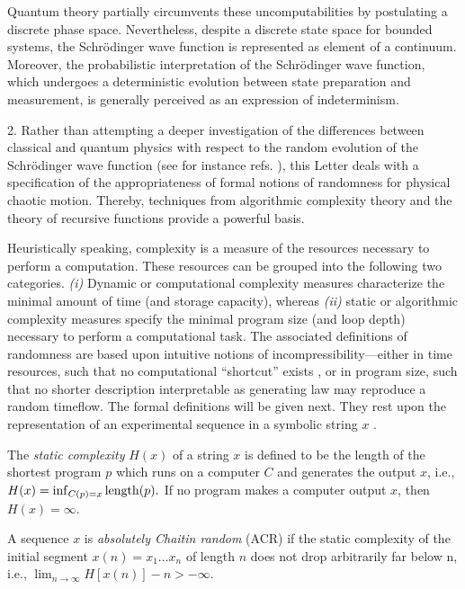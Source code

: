 Quantum theory partially circumvents these uncomputabilities
by postulating a discrete phase space. Nevertheless, despite a discrete
state space for bounded systems, the Schr\"odinger wave function is
represented as element of a continuum.
Moreover, the probabilistic interpretation of the Schr\"odinger wave
function, which undergoes a deterministic evolution between state
preparation and measurement, is generally perceived as
an expression of indeterminism.

2.
Rather than attempting a deeper investigation of the differences between
classical and quantum physics with respect to the random evolution
of the Schr\"odinger wave function (see
for instance refs.
\cite{krylov1,chirikov3,casati1,casati2,casati3,svozil1}),
this Letter deals with a specification of the appropriateness of formal
notions of randomness for physical chaotic motion.
Thereby, techniques from algorithmic complexity theory and the theory of
recursive functions provide a powerful basis.

Heuristically speaking, complexity is a measure of the resources
necessary to perform a computation.
These resources can be grouped into the following two categories.
{\it (i)}
Dynamic or computational complexity measures characterize the minimal
amount of time (and storage capacity), whereas
{\it (ii)}
static or algorithmic complexity measures specify the minimal
program size (and loop depth) necessary to perform a computational task.
The associated definitions of randomness are based upon intuitive
notions of incompressibility---either in time resources, such that no
computational ``shortcut'' exists \cite{wolfram1}, or in program size,
such that no shorter description interpretable as generating law
\cite{chaitin1} may reproduce a random timeflow.
The formal definitions will be given next.
They rest upon the representation of an experimental sequence in
a symbolic string $x$ \cite{alekseev}.

The {\sl static complexity} $H(x)$ of a string $x$ is defined to be the
length
of the shortest program $p$ which runs on a computer $C$ and generates
the output $x$, i.e., $H(x)=\inf_{C(p)=x} {\rm length}(p).$
If no program makes a computer output $x$, then $H(x)=\infty $.

A sequence $x$ is {\sl absolutely Chaitin random} (ACR)
\cite{chaitin1,chaitin2,chaitin3}
if the  static complexity
of the initial segment $x(n)=x_1\ldots x_n$ of length $n$
does not drop arbitrarily far below n, i.e.,
$\lim_{n\rightarrow \infty}   H[x(n)]-n>-\infty $.

